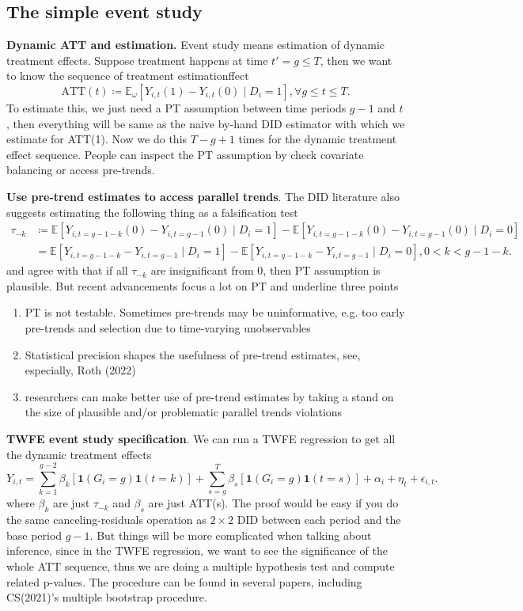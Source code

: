 \documentclass[12pt]{article}
\begin{document}
\subsection{The simple event study}

\textbf{Dynamic ATT and estimation.} Event study means estimation of dynamic treatment
effects. Suppose treatment happens at time \( t' = g \le T \), then we want
to know the sequence of treatment estimationffect
\[
  \text{ATT}(t) \coloneqq \mathbb{E}_{\omega}[Y_{i,t}(1) - Y_{i,t}(0) \mid D_i = 1],
  \forall g \le t \le T
.\]
To estimate this, we just need a PT assumption between time periods \( g-1 \) and \( t
\), then everything will be same as
the naive by-hand DID estimator with which we estimate for ATT(1). Now we do this \(
T-g+1 \) times for the dynamic
treatment effect sequence. People can inspect the PT assumption by check covariate balancing
or access pre-trends.

\textbf{Use pre-trend estimates to access parallel trends}. The DID literature also
suggests estimating the following thing
as a falsification test
\begin{align*}
  \tau_{-k} &\coloneqq \mathbb{E}[Y_{i,t=g-1-k}(0)-Y_{i,t=g-1}(0) \mid D_i = 1] -
  \mathbb{E}[Y_{i,t=g-1-k}(0)-Y_{i,t=g-1}(0) \mid D_i = 0] \\
  &= \mathbb{E}[Y_{i,t=g-1-k}-Y_{i,t=g-1} \mid D_i = 1] -
  \mathbb{E}[Y_{i,t=g-1-k}-Y_{i,t=g-1} \mid D_i = 0], 0 < k < g-1-k
  .
\end{align*}
and agree with that if all \( \tau_{-k} \) are insignificant from 0, then PT assumption
is plausible. But recent advancements
focus a lot on PT and underline three points
\begin{enumerate}
  \item PT is not testable. Sometimes pre-trends may be uninformative, e.g. too early
    pre-trends and selection due to time-varying unobservables
  \item Statistical precision shapes the usefulness of pre-trend estimates, see,
    especially, Roth (2022)
  \item researchers can make better use of pre-trend estimates by taking a stand on the
    size of plausible and/or problematic parallel trends violations
\end{enumerate}

\textbf{TWFE event study specification}. We can run a TWFE regression to get all the
dynamic treatment effects
\[
  Y_{i,t} = \sum_{k=1}^{g-2} \beta_k \left[ \mathbf{1}(G_i=g) \mathbf{1}(t=k) \right] +
  \sum_{s=g}^{T} \beta_s  \left[ \mathbf{1}(G_i=g) \mathbf{1}(t=s) \right] + \alpha_i +
  \eta_t + \epsilon_{i,t}
.\]
where \( \beta_k \) are just \( \tau_{-k} \) and \( \beta_s \) are just ATT(s). The proof
would be easy if you
do the same canceling-residuals operation as \( 2 \times 2 \) DID between each period and
the base period \( g-1 \).
But things will be more complicated when talking about inference, since in the TWFE
regression, we want to see
the significance of the whole ATT sequence, thus we are doing a multiple hypothesis test
and compute related p-values.
The procedure can be found in several papers, including CS(2021)'s multiple bootstrap procedure.
\end{document}
